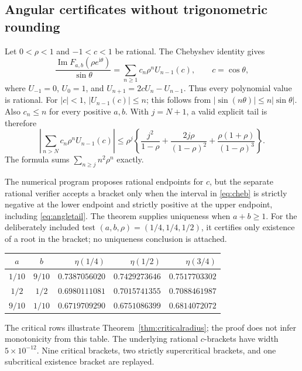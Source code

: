 \documentclass[11pt]{article}
\numberwithin{equation}{section}
\theoremstyle{definition}\newtheorem{definition}[theorem]{Definition}
\theoremstyle{remark}\newtheorem{remark}[theorem]{Remark}
\newcommand{\ii}{\mathrm i}
\DeclareMathOperator{\Impart}{Im}
\begin{document}
\subsection{Angular certificates without trigonometric rounding}
Let $0<\rho<1$ and $-1<c<1$ be rational. The Chebyshev identity gives
\begin{equation}\label{eq:cheb}
 \frac{\Impart F_{a,b}(\rho e^{\ii\theta})}{\sin\theta}
 =\sum_{n\ge1}c_n\rho^n U_{n-1}(c),\qquad c=\cos\theta,
\end{equation}
where $U_{-1}=0$, $U_0=1$, and
$U_{n+1}=2cU_n-U_{n-1}$. Thus every polynomial value is rational.
For $|c|<1$, $|U_{n-1}(c)|\le n$; this follows from
$|\sin(n\theta)|\le n|\sin\theta|$. Also $c_n\le n$ for every
positive $a,b$. With $j=N+1$, a valid explicit tail is therefore
\begin{equation}\label{eq:angletail}
 \left|\sum_{n>N}c_n\rho^nU_{n-1}(c)\right|
 \le\rho^j\left\{\frac{j^2}{1-\rho}
       +\frac{2j\rho}{(1-\rho)^2}
       +\frac{\rho(1+\rho)}{(1-\rho)^3}\right\}.
\end{equation}
The formula sums $\sum_{n\ge j}n^2\rho^n$ exactly.

The numerical program proposes rational endpoints for $c$, but the
separate rational verifier accepts a bracket only when the interval
in \eqref{eq:cheb} is strictly negative at the lower endpoint and
strictly positive at the upper endpoint, including \eqref{eq:angletail}.
The theorem supplies uniqueness when $a+b\ge1$. For the deliberately
included test $(a,b,\rho)=(1/4,1/4,1/2)$, it certifies only existence
of a root in the bracket; no uniqueness conclusion is attached.

\begin{center}
\small
\begin{tabular}{@{}c c r r r@{}}
\toprule
$a$ & $b$ & $\eta(1/4)$ & $\eta(1/2)$ & $\eta(3/4)$\\
\midrule
$1/10$ & $9/10$ & $0.7387056020$ & $0.7429273646$ & $0.7517703302$\\
$1/2$ & $1/2$ & $0.6980111081$ & $0.7015741355$ & $0.7088461987$\\
$9/10$ & $1/10$ & $0.6719709290$ & $0.6751086399$ & $0.6814072072$\\
\bottomrule
\end{tabular}
\end{center}
The critical rows illustrate Theorem~\ref{thm:criticalradius}; the
proof does not infer monotonicity from this table. The underlying
rational $c$-brackets have width $5\times10^{-12}$. Nine critical
brackets, two strictly supercritical brackets, and one subcritical
existence bracket are replayed.
\end{document}

